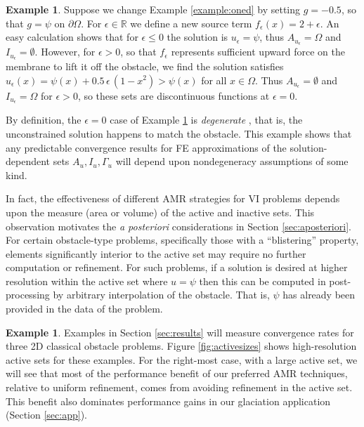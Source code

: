 \documentclass[]{interact}
\theoremstyle{plain}%
\theoremstyle{definition}
\newtheorem{example}[theorem]{Example}
\theoremstyle{remark}
\newcommand{\RR}{\mathbb{R}}
\newcommand{\eps}{\epsilon}
\begin{document}
\begin{example} \label{example:notcontinuous} Suppose we change Example \ref{example:oned} by setting $g=-0.5$, so that $g=\psi$ on $\partial\Omega$.  For $\eps\in\RR$ we define a new source term $f_\eps(x)=2+\eps$.  An easy calculation shows that for $\eps\le 0$ the solution is $u_\eps=\psi$, thus $A_{u_\eps}=\Omega$ and $I_{u_\eps}=\emptyset$.  However, for $\eps>0$, so that $f_\eps$ represents sufficient upward force on the membrane to lift it off the obstacle, we find the solution satisfies $u_\eps(x)=\psi(x) + 0.5\, \eps\, (1-x^2) > \psi(x)$ for all $x\in\Omega$.  Thus $A_{u_\eps}=\emptyset$ and $I_{u_\eps}=\Omega$ for $\eps>0$, so these sets are discontinuous functions at $\eps=0$. \end{example}

By definition, the $\eps=0$ case of Example \ref{example:notcontinuous} is \emph{degenerate} \cite{KinderlehrerStampacchia1980}, that is, the unconstrained solution happens to match the obstacle.  This example shows that any predictable convergence results for FE approximations of the solution-dependent sets $A_u,I_u,\Gamma_u$ will depend upon nondegeneracy assumptions of some kind.

In fact, the effectiveness of different AMR strategies for VI problems depends upon the measure (area or volume) of the active and inactive sets.  This observation motivates the \emph{a posteriori} considerations in Section \ref{sec:aposteriori}.  For certain obstacle-type problems, specifically those with a ``blistering'' property, elements significantly interior to the active set may require no further computation or refinement.  For such problems, if a solution is desired at higher resolution within the active set where $u=\psi$ then this can be computed in post-processing by arbitrary interpolation of the obstacle.  That is, $\psi$ has already been provided in the data of the problem.

\begin{example} \label{example:activesets} Examples in Section \ref{sec:results} will measure convergence rates for three 2D classical obstacle problems.  Figure \ref{fig:activesizes} shows high-resolution active sets for these examples.  For the right-most case, with a large active set, we will see that most of the performance benefit of our preferred AMR techniques, relative to uniform refinement, comes from avoiding refinement in the active set.  This benefit also dominates performance gains in our glaciation application (Section \ref{sec:app}). \end{example}
\end{document}
